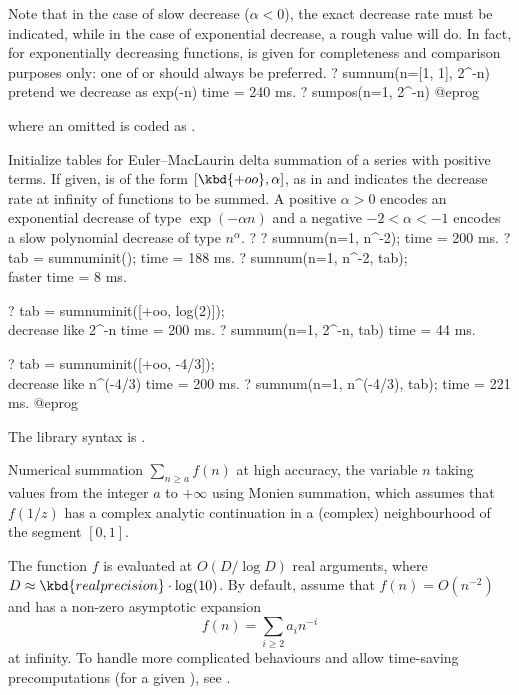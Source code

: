 Note that in the case of slow decrease ($\alpha < 0$), the exact
decrease rate must be indicated, while in the case of exponential decrease,
a rough value will do. In fact, for exponentially decreasing functions,
 is given for completeness and comparison purposes only: one
of  or  should always be preferred.
\bprog
? sumnum(n=[1, 1], 2^-n) \\ pretend we decrease as exp(-n)
time = 240 ms.
? sumpos(n=1, 2^-n)
@eprog

where an omitted  is coded as .

\label{se:sumnuminit}
Initialize tables for Euler--MacLaurin delta summation of a series with
positive terms. If given,  is of the form $[\kbd{+oo}, \alpha]$,
as in  and indicates the decrease rate at infinity of functions
to be summed. A positive
$\alpha > 0$ encodes an exponential decrease of type $\exp(-\alpha n)$ and
a negative $-2 < \alpha < -1$ encodes a slow polynomial decrease of type
$n^{\alpha}$.
\bprog
? 
? sumnum(n=1, n^-2);
time = 200 ms.
? tab = sumnuminit();
time = 188 ms.
? sumnum(n=1, n^-2, tab); \\ faster
time = 8 ms.

? tab = sumnuminit([+oo, log(2)]); \\ decrease like 2^-n
time = 200 ms.
? sumnum(n=1, 2^-n, tab)
time = 44 ms.

? tab = sumnuminit([+oo, -4/3]); \\ decrease like n^(-4/3)
time = 200 ms.
? sumnum(n=1, n^(-4/3), tab);
time = 221 ms.
@eprog

The library syntax is .

\label{se:sumnummonien}
Numerical summation $\sum_{n\geq a} f(n)$ at high accuracy, the variable
$n$ taking values from the integer $a$ to $+\infty$ using Monien summation,
which assumes that $f(1/z)$ has a complex analytic continuation in a (complex)
neighbourhood of the segment $[0,1]$.

The function $f$ is evaluated at $O(D / \log D)$ real arguments,
where $D \approx \kbd{realprecision} \cdot \log(10)$.
By default, assume that $f(n) = O(n^{-2})$ and has a non-zero asymptotic
expansion
$$f(n) = \sum_{i\geq 2} a_i n^{-i}$$
at infinity. To handle more complicated behaviours and allow time-saving
precomputations (for a given ), see .

